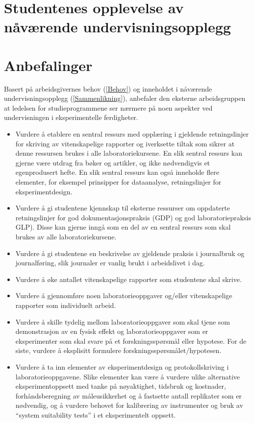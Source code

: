 \documentclass{article}
\begin{document}


\section{Studentenes opplevelse av nåværende undervisningsopplegg}

\section{Anbefalinger}
Basert på arbeidsgivernes behov (\cref{Behov}) og inneholdet i nåværende undervisningsopplegg (\cref{Sammenlikning}), anbefaler den eksterne arbeidsgruppen at ledelsen for studieprogrammene ser nærmere på noen aspekter ved undervisningen i eksperimentelle ferdigheter.
\begin{itemize}
  \item Vurdere å etablere en sentral ressurs med opplæring i gjeldende retningslinjer for skriving av vitenskapelige rapporter og iverksette tiltak som sikrer at denne  ressursen brukes i alle laboratoriekursene. En slik sentral ressurs kan gjerne være utdrag fra bøker og artikler, og ikke nødvendigvis et egenprodusert hefte. En slik sentral ressurs kan også inneholde flere elementer, for eksempel prinsipper for dataanalyse, retningslinjer for eksperimentdesign.  
   \item Vurdere å gi studentene kjennskap til eksterne ressurser om oppdaterte retningslinjer for god dokumentasjonspraksis (GDP) og god laboratoriepraksis GLP). Disse kan gjerne inngå som en del av en sentral ressurs som skal brukes av alle laboratoriekursene.
      \item Vurdere å gi studentene en beskrivelse av gjeldende praksis i journalbruk og journalføring, slik journaler er vanlig brukt i arbeidslivet i dag.
  \item Vurdere å øke antallet vitenskapelige rapporter som studentene skal skrive. 
  \item Vurdere å gjennomføre noen laboratorieoppgaver og/eller vitenskapelige rapporter som individuelt arbeid.
  \item Vurdere å skille tydelig mellom laboratorieoppgaver som skal tjene som demonstrasjon av en fysisk effekt og laboratorieoppgaver som er eksperimenter som skal svare på et forskningsspørsmål eller hypotese. For de siste, vurdere å eksplisitt formulere forskningsspørsmålet/hypotesen.
  \item Vurdere å ta inn elementer av eksperimentdesign og protokollskriving i laboratorieoppgavene. Slike elementer kan være å vurdere ulike alternative eksperimentoppsett med tanke på nøyaktighet, tidsbruk og kostnader, forhåndsberegning av måleusikkerhet og å fastsette antall replikater som er nødvendig, og å vurdere behovet for kalibrering av instrumenter og bruk av ``system suitability tests'' i et eksperimentelt oppsett.
\end{itemize}
\end{document}

